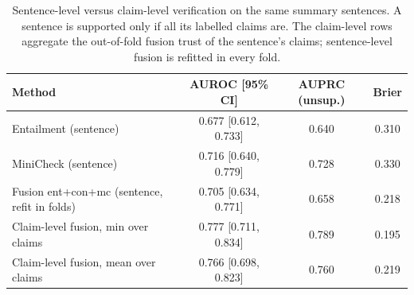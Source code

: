 \begin{table}[htbp]
\centering
\caption{Sentence-level versus claim-level verification on the same summary sentences. A sentence is supported only if all its labelled claims are. The claim-level rows aggregate the out-of-fold fusion trust of the sentence's claims; sentence-level fusion is refitted in every fold.}
\label{tab:sentlevel}
\small
\begin{tabular}{@{}lccc@{}}
\toprule
Method & AUROC [95\% CI] & AUPRC (unsup.) & Brier \\
\midrule
Entailment (sentence) & 0.677 [0.612, 0.733] & 0.640 & 0.310 \\
MiniCheck (sentence) & 0.716 [0.640, 0.779] & 0.728 & 0.330 \\
Fusion ent+con+mc (sentence, refit in folds) & 0.705 [0.634, 0.771] & 0.658 & 0.218 \\
Claim-level fusion, min over claims & 0.777 [0.711, 0.834] & 0.789 & 0.195 \\
Claim-level fusion, mean over claims & 0.766 [0.698, 0.823] & 0.760 & 0.219 \\
\bottomrule
\end{tabular}
\end{table}